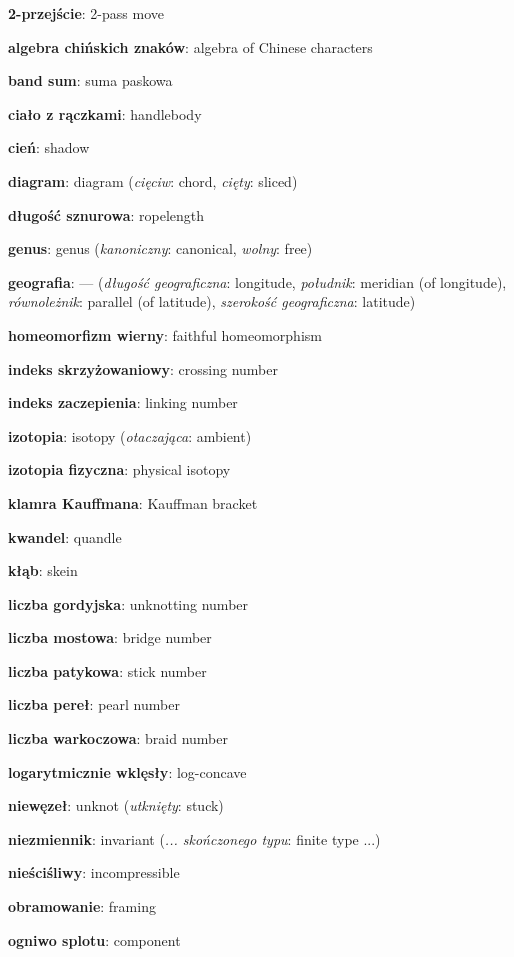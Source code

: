 \item \textbf{2-przejście}: 2-pass move
\item \textbf{algebra chińskich znaków}: algebra of Chinese characters
\item \textbf{band sum}: suma paskowa
\item \textbf{ciało z rączkami}: handlebody
\item \textbf{cień}: shadow
\item \textbf{diagram}: diagram
(\emph{cięciw}: chord, \emph{cięty}: sliced)
\item \textbf{długość sznurowa}: ropelength
\item \textbf{genus}: genus
(\emph{kanoniczny}: canonical, \emph{wolny}: free)
\item \textbf{geografia}: ---
(\emph{długość geograficzna}: longitude, \emph{południk}: meridian (of longitude), \emph{równoleżnik}: parallel (of latitude), \emph{szerokość geograficzna}: latitude)
\item \textbf{homeomorfizm wierny}: faithful homeomorphism
\item \textbf{indeks skrzyżowaniowy}: crossing number
\item \textbf{indeks zaczepienia}: linking number
\item \textbf{izotopia}: isotopy
(\emph{otaczająca}: ambient)
\item \textbf{izotopia fizyczna}: physical isotopy
\item \textbf{klamra Kauffmana}: Kauffman bracket
\item \textbf{kwandel}: quandle
\item \textbf{kłąb}: skein
\item \textbf{liczba gordyjska}: unknotting number
\item \textbf{liczba mostowa}: bridge number
\item \textbf{liczba patykowa}: stick number
\item \textbf{liczba pereł}: pearl number
\item \textbf{liczba warkoczowa}: braid number
\item \textbf{logarytmicznie wklęsły}: log-concave
\item \textbf{niewęzeł}: unknot
(\emph{utknięty}: stuck)
\item \textbf{niezmiennik}: invariant
(\emph{... skończonego typu}: finite type ...)
\item \textbf{nieściśliwy}: incompressible
\item \textbf{obramowanie}: framing
\item \textbf{ogniwo splotu}: component
